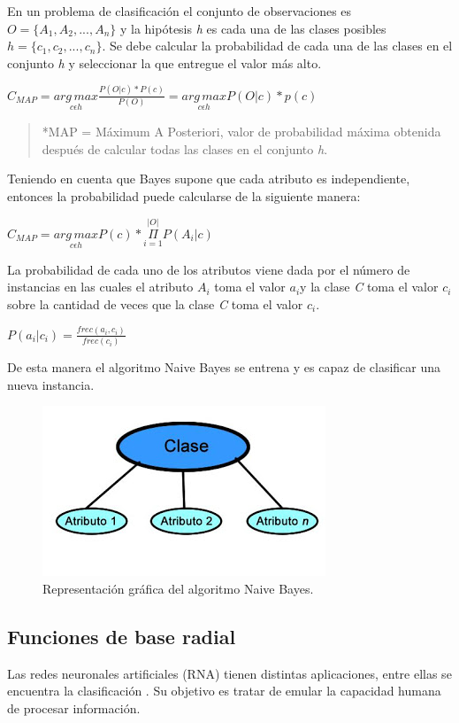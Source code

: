 En un problema de clasificación el conjunto de observaciones es $O=\{A_{1},A_{2},...,A_{n}\}$ y la hipótesis \emph{h} es cada una de las clases posibles $h=\{c_{1},c_{2},...,c_{n}\}$. Se debe calcular la probabilidad de cada una de las clases en el conjunto \emph{h} y seleccionar la que entregue el valor más alto.
\begin{center}
$C_{MAP}=\underset{c\epsilon h}{arg\, max}\frac{P(O|c)*P(c)}{P(O)}=\underset{c\epsilon h}{arg\, max}P(O|c)*p(c)$
\end{center}
\begin{quote}
{*}MAP = Máximum A Posteriori, valor de probabilidad máxima obtenida después de calcular todas las clases en el conjunto \emph{h}.
\end{quote}
Teniendo en cuenta que Bayes supone que cada atributo es independiente,
entonces la probabilidad puede calcularse de la siguiente manera:
\begin{center}
$C_{MAP}=\underset{c\epsilon h}{arg\, max}P(c)*\overset{|O|}{\underset{i=1}{\Pi}}P(A_{i}|c)$
\end{center}
La probabilidad de cada uno de los atributos viene dada por el número
de instancias en las cuales el atributo $A_{i}$ toma el valor $a_{i}$y
la clase \emph{C} toma el valor $c_{i}$ sobre la cantidad de veces
que la clase \emph{C} toma el valor $c_{i}$\cite{key-50, key-190}.
\begin{center}
$P(a_{i}|c_{i})=\frac{frec(a_{i},c_{i})}{frec(c_{i})}$
\end{center}
De esta manera el algoritmo Naive Bayes se entrena y es capaz de clasificar
una nueva instancia.
\begin{figure}[H]
\begin{centering}
\includegraphics[scale=0.6]{nive}
\par\end{centering}
\caption{Representación gráfica del algoritmo Naive Bayes.}
\end{figure}
\subsection{Funciones de base radial}
Las redes neuronales artificiales (RNA) tienen distintas aplicaciones, entre ellas se encuentra la clasificación \cite{key-250}. Su objetivo es tratar de emular la capacidad humana de procesar información. 

